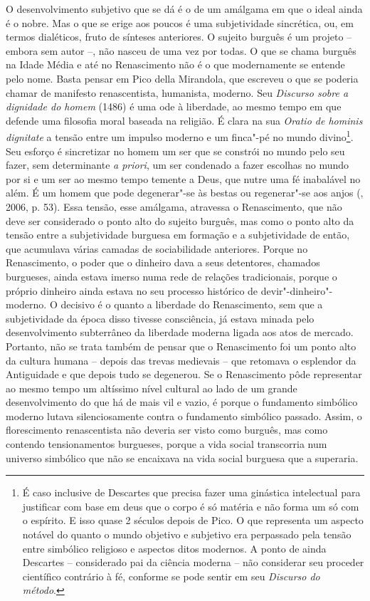 O desenvolvimento subjetivo que se dá é o de um amálgama em que o ideal
ainda é o nobre. Mas o que se erige aos poucos é uma subjetividade
sincrética, ou, em termos dialéticos, fruto de sínteses anteriores. O
sujeito burguês é um projeto -- embora sem autor --, não nasceu de uma
vez por todas. O que se chama burguês na Idade Média e até no
Renascimento não é o que modernamente se entende pelo nome. Basta pensar
em Pico della Mirandola, que escreveu o que se poderia chamar de
manifesto renascentista, humanista, moderno. Seu \emph{Discurso sobre a
dignidade do homem} (1486) é uma ode à liberdade, ao mesmo tempo em
que defende uma filosofia moral baseada na religião. É clara na sua
\emph{Oratio de hominis dignitate} a tensão entre um impulso moderno e
um finca"-pé no mundo divino\footnote{É caso inclusive de Descartes que
  precisa fazer uma ginástica intelectual para justificar com base em
  deus que o corpo é só matéria e não forma um só com o espírito. E isso
  quase 2 séculos depois de Pico. O que representa um aspecto notável do
  quanto o mundo objetivo e subjetivo era perpassado pela tensão entre
  simbólico religioso e aspectos ditos modernos. A ponto de ainda
  Descartes -- considerado pai da ciência moderna -- não considerar seu
  proceder científico contrário à fé, conforme se pode sentir em seu
  \emph{Discurso do método}.}. Seu esforço é sincretizar no homem
um ser que se constrói no mundo pelo seu fazer, sem determinante \emph{a
priori}, um ser condenado a fazer escolhas no mundo por si e um ser ao
mesmo tempo temente a Deus, que nutre uma fé inabalável no além. É um
homem que pode degenerar"-se às bestas ou regenerar"-se aos anjos
(, 2006, p. 53). Essa tensão, esse amálgama, atravessa o
Renascimento, que não deve ser considerado o ponto alto do sujeito
burguês, mas como o ponto alto da tensão entre a subjetividade burguesa
em formação e a subjetividade de então, que acumulava várias camadas de
sociabilidade anteriores. Porque no Renascimento, o poder que o dinheiro
dava a seus detentores, chamados burgueses, ainda estava imerso numa
rede de relações tradicionais, porque o próprio dinheiro ainda estava no
seu processo histórico de devir"-dinheiro"-moderno. O decisivo é o quanto
a liberdade do Renascimento, sem que a subjetividade da época disso
tivesse consciência, já estava minada pelo desenvolvimento subterrâneo
da liberdade moderna ligada aos atos de mercado. Portanto, não se trata
também de pensar que o Renascimento foi um ponto alto da cultura humana
-- depois das trevas medievais -- que retomava o esplendor da
Antiguidade e que depois tudo se degenerou. Se o Renascimento pôde
representar ao mesmo tempo um altíssimo nível cultural ao lado de um
grande desenvolvimento do que há de mais vil e vazio, é porque o
fundamento simbólico moderno lutava silenciosamente contra o fundamento
simbólico passado. Assim, o florescimento renascentista não deveria ser
visto como burguês, mas como contendo tensionamentos burgueses, porque a
vida social transcorria num universo simbólico que não se encaixava na
vida social burguesa que a superaria.

